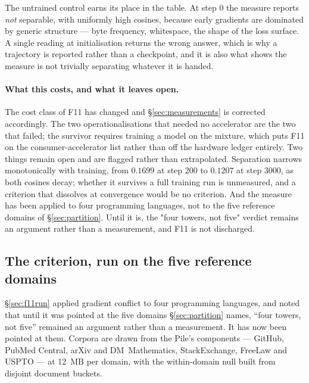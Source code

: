 \documentclass[11pt]{article}
\begin{document}
The untrained control earns its place in the table. At step 0 the measure reports \emph{not} separable, with uniformly high cosines, because early gradients are dominated by generic structure --- byte frequency, whitespace, the shape of the loss surface. A single reading at initialisation returns the wrong answer, which is why a trajectory is reported rather than a checkpoint, and it is also what shows the measure is not trivially separating whatever it is handed.

\paragraph{What this costs, and what it leaves open.} The cost class of F11 has changed and \S\ref{sec:measurements} is corrected accordingly. The two operationalisations that needed no accelerator are the two that failed; the survivor requires training a model on the mixture, which puts F11 on the consumer-accelerator list rather than off the hardware ledger entirely. Two things remain open and are flagged rather than extrapolated. Separation narrows monotonically with training, from $0.1699$ at step 200 to $0.1207$ at step 3000, as both cosines decay; whether it survives a full training run is unmeasured, and a criterion that dissolves at convergence would be no criterion. And the measure has been applied to four programming languages, not to the five reference domains of \S\ref{sec:partition}. Until it is, the "four towers, not five" verdict remains an argument rather than a measurement, and F11 is not discharged.

\subsection{The criterion, run on the five reference domains}
\label{sec:f11five}

\S\ref{sec:f11run} applied gradient conflict to four programming languages, and noted that until it was pointed at the five domains \S\ref{sec:partition} names, ``four towers, not five'' remained an argument rather than a measurement. It has now been pointed at them. Corpora are drawn from the Pile's components --- GitHub, PubMed Central, arXiv and DM~Mathematics, StackExchange, FreeLaw and USPTO --- at 12~MB per domain, with the within-domain null built from disjoint document buckets.
\end{document}
